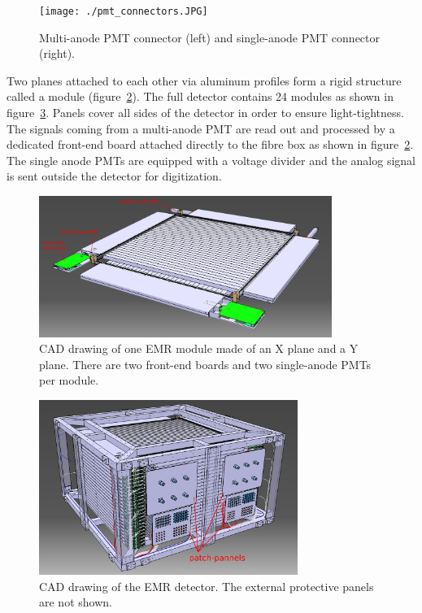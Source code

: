 \documentclass[a4paper,11pt]{article}
\begin{document}
\begin{figure}[htp!]
 \centering
 \texttt{[image: ./pmt\_connectors.JPG]}
 \caption[PMT connectors]{Multi-anode PMT connector (left) and single-anode PMT connector (right).}
 \label{fig:pmt_connectors}
\end{figure}

Two planes attached to each other via aluminum profiles form a rigid structure called a module (figure~\ref{fig:emr_module}). 
The full detector contains 24 modules as shown in figure~\ref{fig:emr_full_cad_model}. Panels cover all sides of the detector
in order to ensure light-tightness. The signals coming from a multi-anode PMT are read out and processed by a dedicated front-end board
attached directly to the fibre box as shown in figure~\ref{fig:emr_module}. The single anode PMTs are equipped with a
voltage divider and the analog signal is sent outside the detector for digitization.

\begin{figure}[htb]
 \centering
 \includegraphics[width=0.85\textwidth]{./emr_module}
 \caption[CAD drawing of one EMR module]{CAD drawing of one EMR module made of an X plane and a Y plane. There are two front-end boards and two single-anode PMTs per module.}
 \label{fig:emr_module}
\end{figure}

\begin{figure}[htp!]
 \centering
 \includegraphics[width=0.75\textwidth]{./emr_cad_model_1}
 \caption[CAD drawing of the EMR detector]{CAD drawing of the EMR detector. The external protective panels are not shown.}
 \label{fig:emr_full_cad_model}
\end{figure}
\end{document}
